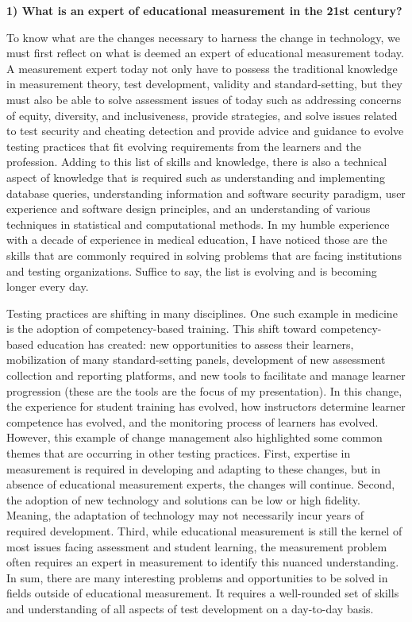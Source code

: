 \documentclass[
]{book}
\begin{document}
\textbf{1) What is an expert of educational measurement in the 21st century?}

To know what are the changes necessary to harness the change in technology, we must first reflect on what is deemed an expert of educational measurement today. A measurement expert today not only have to possess the traditional knowledge in measurement theory, test development, validity and standard-setting, but they must also be able to solve assessment issues of today such as addressing concerns of equity, diversity, and inclusiveness, provide strategies, and solve issues related to test security and cheating detection and provide advice and guidance to evolve testing practices that fit evolving requirements from the learners and the profession. Adding to this list of skills and knowledge, there is also a technical aspect of knowledge that is required such as understanding and implementing database queries, understanding information and software security paradigm, user experience and software design principles, and an understanding of various techniques in statistical and computational methods. In my humble experience with a decade of experience in medical education, I have noticed those are the skills that are commonly required in solving problems that are facing institutions and testing organizations. Suffice to say, the list is evolving and is becoming longer every day.

Testing practices are shifting in many disciplines. One such example in medicine is the adoption of competency-based training. This shift toward competency-based education has created: new opportunities to assess their learners, mobilization of many standard-setting panels, development of new assessment collection and reporting platforms, and new tools to facilitate and manage learner progression (these are the tools are the focus of my presentation). In this change, the experience for student training has evolved, how instructors determine learner competence has evolved, and the monitoring process of learners has evolved. However, this example of change management also highlighted some common themes that are occurring in other testing practices. First, expertise in measurement is required in developing and adapting to these changes, but in absence of educational measurement experts, the changes will continue. Second, the adoption of new technology and solutions can be low or high fidelity. Meaning, the adaptation of technology may not necessarily incur years of required development. Third, while educational measurement is still the kernel of most issues facing assessment and student learning, the measurement problem often requires an expert in measurement to identify this nuanced understanding. In sum, there are many interesting problems and opportunities to be solved in fields outside of educational measurement. It requires a well-rounded set of skills and understanding of all aspects of test development on a day-to-day basis.
\end{document}
